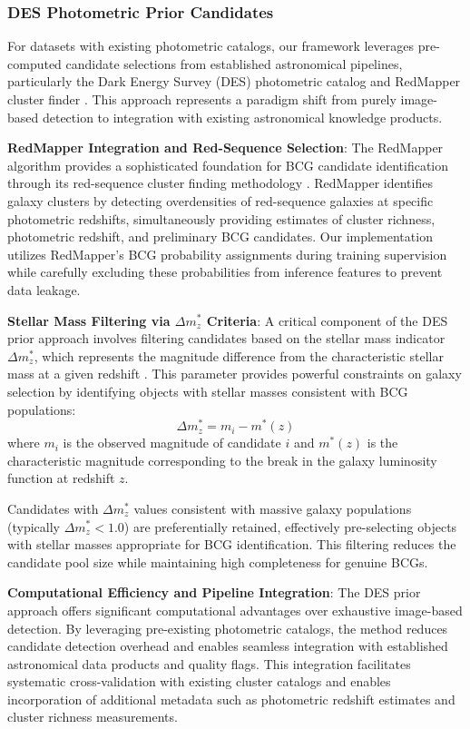 \documentclass[twocolumn,10pt]{aastex631}
\begin{document}
\subsubsection{DES Photometric Prior Candidates}

For datasets with existing photometric catalogs, our framework leverages pre-computed candidate selections from established astronomical pipelines, particularly the Dark Energy Survey (DES) photometric catalog and RedMapper cluster finder \citep{Rykoff2014redMaPPer,Rykoff2016}. This approach represents a paradigm shift from purely image-based detection to integration with existing astronomical knowledge products.

\textbf{RedMapper Integration and Red-Sequence Selection}: The RedMapper algorithm provides a sophisticated foundation for BCG candidate identification through its red-sequence cluster finding methodology \citep{Rykoff2014redMaPPer}. RedMapper identifies galaxy clusters by detecting overdensities of red-sequence galaxies at specific photometric redshifts, simultaneously providing estimates of cluster richness, photometric redshift, and preliminary BCG candidates. Our implementation utilizes RedMapper's BCG probability assignments during training supervision while carefully excluding these probabilities from inference features to prevent data leakage.

\textbf{Stellar Mass Filtering via $\Delta m^*_z$ Criteria}: A critical component of the DES prior approach involves filtering candidates based on the stellar mass indicator $\Delta m^*_z$, which represents the magnitude difference from the characteristic stellar mass at a given redshift \citep{Rykoff2016}. This parameter provides powerful constraints on galaxy selection by identifying objects with stellar masses consistent with BCG populations:
\begin{equation}
\Delta m^*_z = m_i - m^*(z)
\end{equation}
where $m_i$ is the observed magnitude of candidate $i$ and $m^*(z)$ is the characteristic magnitude corresponding to the break in the galaxy luminosity function at redshift $z$.

Candidates with $\Delta m^*_z$ values consistent with massive galaxy populations (typically $\Delta m^*_z < 1.0$) are preferentially retained, effectively pre-selecting objects with stellar masses appropriate for BCG identification. This filtering reduces the candidate pool size while maintaining high completeness for genuine BCGs.

\textbf{Computational Efficiency and Pipeline Integration}: The DES prior approach offers significant computational advantages over exhaustive image-based detection. By leveraging pre-existing photometric catalogs, the method reduces candidate detection overhead and enables seamless integration with established astronomical data products and quality flags. This integration facilitates systematic cross-validation with existing cluster catalogs and enables incorporation of additional metadata such as photometric redshift estimates and cluster richness measurements.
\end{document}
